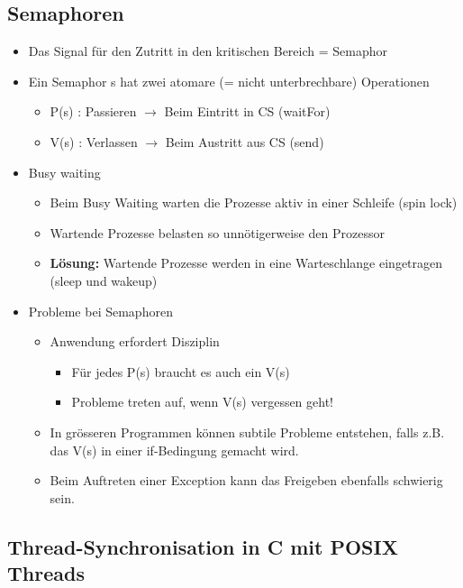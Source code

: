  \subsection{Semaphoren}
 \begin{itemize}
   \item Das Signal für den Zutritt in den kritischen Bereich = Semaphor
   \item Ein Semaphor s hat zwei atomare (= nicht unterbrechbare)
     Operationen
   \begin{itemize}
     \item P(s) : Passieren $\rightarrow$ Beim Eintritt in CS (waitFor)
     \item V(s) : Verlassen $\rightarrow$ Beim Austritt aus CS (send)
   \end{itemize}
   \item Busy waiting
   \begin{itemize}
   \item Beim Busy Waiting warten die Prozesse aktiv in einer Schleife (spin lock)
   \item Wartende Prozesse belasten so unnötigerweise den Prozessor
   \item \textbf{Lösung:} Wartende Prozesse werden in eine Warteschlange eingetragen (sleep und
wakeup)
   \end{itemize}
   \item Probleme bei Semaphoren
   \begin{itemize}
    \item Anwendung erfordert Disziplin
    \begin{itemize}
      \item Für jedes P(s) braucht es auch ein V(s)
      \item Probleme treten auf, wenn V(s) vergessen geht!
    \end{itemize}
    \item In grösseren Programmen können subtile Probleme entstehen, falls z.B. das V(s) in einer if-Bedingung gemacht wird.
    \item Beim Auftreten einer Exception kann das Freigeben ebenfalls
      schwierig sein. 

   \end{itemize}
 \end{itemize}
 
\subsection{Thread-Synchronisation in C mit POSIX Threads}


